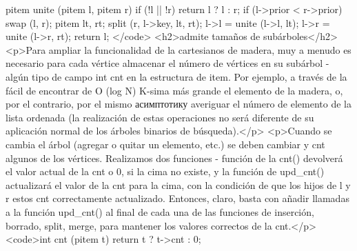 pitem unite (pitem l, pitem r) {
if (!l || !r) return l ? l : r;
if (l->prior < r->prior) swap (l, r);
pitem lt, rt;
split (r, l->key, lt, rt);
l->l = unite (l->l, lt);
l->r = unite (l->r, rt);
return l;
}</code>
<h2>admite tamaños de subárboles</h2>
<p>Para ampliar la funcionalidad de la cartesianos de madera, muy a menudo es necesario para cada vértice almacenar el número de vértices en su subárbol - algún tipo de campo int cnt en la estructura de item. Por ejemplo, a través de la fácil de encontrar de O (log N) K-sima más grande el elemento de la madera, o, por el contrario, por el mismo асимптотику averiguar el número de elemento de la lista ordenada (la realización de estas operaciones no será diferente de su aplicación normal de los árboles binarios de búsqueda).</p>
<p>Cuando se cambia el árbol (agregar o quitar un elemento, etc.) se deben cambiar y cnt algunos de los vértices. Realizamos dos funciones - función de la cnt() devolverá el valor actual de la cnt o 0, si la cima no existe, y la función de upd_cnt() actualizará el valor de la cnt para la cima, con la condición de que los hijos de l y r estos cnt correctamente actualizado. Entonces, claro, basta con añadir llamadas a la función upd_cnt() al final de cada una de las funciones de inserción, borrado, split, merge, para mantener los valores correctos de la cnt.</p>
<code>int cnt (pitem t) {
return t ? t->cnt : 0;
}

